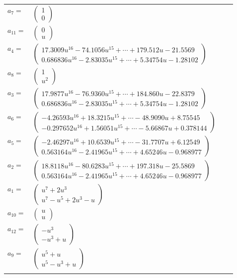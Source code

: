 \documentclass[1p]{elsarticle_modified}
\theoremstyle{definition}
\begin{document}
\begin{tabular}{m{7pt} m{180pt} m{7pt} m{180pt} }
\flushright $a_{7}=$&$\begin{pmatrix}1\\0\end{pmatrix}$ \\
\flushright $a_{11}=$&$\begin{pmatrix}0\\u\end{pmatrix}$ \\
\flushright $a_{4}=$&$\begin{pmatrix}17.3009 u^{16}-74.1056 u^{15}+\cdots+179.512 u-21.5569\\0.686836 u^{16}-2.83035 u^{15}+\cdots+5.34754 u-1.28102\end{pmatrix}$ \\
\flushright $a_{8}=$&$\begin{pmatrix}1\\u^2\end{pmatrix}$ \\
\flushright $a_{3}=$&$\begin{pmatrix}17.9877 u^{16}-76.9360 u^{15}+\cdots+184.860 u-22.8379\\0.686836 u^{16}-2.83035 u^{15}+\cdots+5.34754 u-1.28102\end{pmatrix}$ \\
\flushright $a_{6}=$&$\begin{pmatrix}-4.26593 u^{16}+18.3215 u^{15}+\cdots-48.9090 u+8.75545\\-0.297652 u^{16}+1.56051 u^{15}+\cdots-5.66867 u+0.378144\end{pmatrix}$ \\
\flushright $a_{5}=$&$\begin{pmatrix}-2.46297 u^{16}+10.6539 u^{15}+\cdots-31.7707 u+6.12549\\0.563164 u^{16}-2.41965 u^{15}+\cdots+4.65246 u-0.968977\end{pmatrix}$ \\
\flushright $a_{2}=$&$\begin{pmatrix}18.8118 u^{16}-80.6283 u^{15}+\cdots+197.318 u-25.5869\\0.563164 u^{16}-2.41965 u^{15}+\cdots+4.65246 u-0.968977\end{pmatrix}$ \\
\flushright $a_{1}=$&$\begin{pmatrix}u^7+2 u^3\\u^7- u^5+2 u^3- u\end{pmatrix}$ \\
\flushright $a_{10}=$&$\begin{pmatrix}u\\u\end{pmatrix}$ \\
\flushright $a_{12}=$&$\begin{pmatrix}- u^3\\- u^3+u\end{pmatrix}$ \\
\flushright $a_{9}=$&$\begin{pmatrix}u^5+u\\u^5- u^3+u\end{pmatrix}$\\&\end{tabular}
\end{document}
